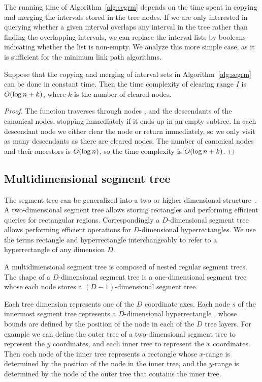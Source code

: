 \documentclass[english,gradu]{tktltiki2018}
\begin{document}
The running time of Algorithm~\ref{alg:segrm} depends on the time spent in copying and merging the intervals stored in the tree nodes.
If we are only interested in querying whether a given interval overlaps any interval in the tree rather than finding the overlapping intervals, we can replace the interval lists by booleans indicating whether the list is non-empty.
We analyze this more simple case, as it is sufficient for the minimum link path algorithms.

\begin{lem}\label{lem:segrmtime}Suppose that the copying and merging of interval sets in Algorithm~\ref{alg:segrm} can be done in constant time.
Then the time complexity of clearing range $I$ is $O(\log n + k)$, where $k$ is the number of cleared nodes.\end{lem}
\begin{proof}
The function \cleariv traverses through nodes ,  and the descendants of the canonical nodes, stopping immediately if it ends up in an empty subtree.
In each descendant node we either clear the node or return immediately, so we only visit as many descendants as there are cleared nodes.
The number of canonical nodes and their ancestors is $O(\log n)$, so the time complexity is $O(\log n + k)$.
\end{proof}


\subsection{Multidimensional segment tree}

The segment tree can be generalized into a two or higher dimensional structure~\cite{highseg}.
A two-dimensional segment tree allows storing rectangles and performing efficient queries for rectangular regions.
Correspondingly a $D$-dimensional segment tree allows performing efficient operations for $D$-dimensional hyperrectangles.
We use the terms rectangle and hyperrectangle interchangeably to refer to a hyperrectangle of any dimension $D$.

A multidimensional segment tree is composed of nested regular segment trees.
The shape of a $D$-dimensional segment tree is a one-dimensional segment tree whose each node stores a $(D-1)$-dimensional segment tree.

Each tree dimension represents one of the $D$ coordinate axes.
Each node $s$ of the innermost segment tree represents a $D$-dimensional hyperrectangle , whose bounds are defined by the position of the node in each of the $D$ tree layers.
For example we can define the outer tree of a two-dimensional segment tree to represent the $y$ coordinates, and each inner tree to represent the $x$ coordinates.
Then each node of the inner tree represents a rectangle whose $x$-range is determined by the position of the node in the inner tree, and the $y$-range is determined by the node of the outer tree that contains the inner tree.
\end{document}
